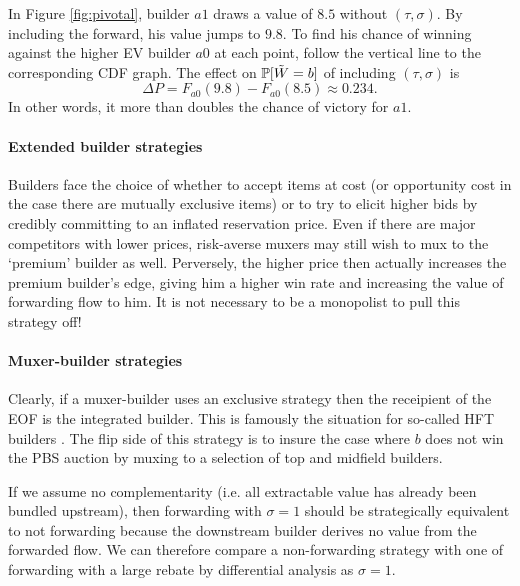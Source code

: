 \begin{example*}


In Figure \ref{fig:pivotal}, builder $a1$ draws a value of $8.5$ without $(\tau,\sigma)$.
%
By including the forward, his value jumps to $9.8$.
%
To find his chance of winning against the higher EV builder $a0$ at each point, follow the vertical line to the corresponding CDF graph.
%
The effect on $\mathbb{P}[\tilde{W}=b]$ of including $(\tau,\sigma)$ is 
\[
  \Delta P = F_{a0}(9.8)-F_{a0}(8.5) \approx 0.234.
\]
%
In other words, it more than doubles the chance of victory for $a1$.

\end{example*}

\paragraph{Extended builder strategies}
%
Builders face the choice of whether to accept items at cost (or opportunity cost in the case there are mutually exclusive items) or to try to elicit higher bids by credibly committing to an inflated reservation price. 
%
Even if there are major competitors with lower prices, risk-averse muxers may still wish to mux to the `premium' builder as well.
%
Perversely, the higher price then actually increases the premium builder's edge, giving him a higher win rate and increasing the value of forwarding flow to him.
%
It is not necessary to be a monopolist to pull this strategy off!


\paragraph{Muxer-builder strategies}

Clearly, if a muxer-builder uses an exclusive strategy then the receipient of the EOF is the integrated builder.
%
This is famously the situation for so-called HFT builders \cite{gupta2023centralizing}.
%
The flip side of this strategy is to insure the case where $b$ does not win the PBS auction by muxing to a selection of top and midfield builders.

\begin{remark*}

  If we assume no complementarity (i.e. all extractable value has already been bundled upstream), then forwarding with $\sigma=1$ should be strategically equivalent to not forwarding because the downstream builder derives no value from the forwarded flow.
  We can therefore compare a non-forwarding strategy with one of forwarding with a large rebate by differential analysis as $\sigma=1$.

\end{remark*}

